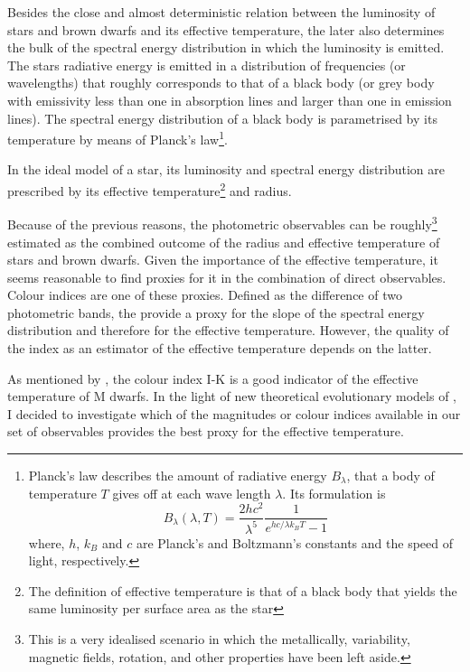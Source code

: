 Besides the close and almost deterministic relation between the luminosity of stars and brown dwarfs and its effective temperature, the later also determines the bulk of the spectral energy distribution in which the luminosity is emitted. The stars radiative energy is emitted in a distribution of frequencies (or wavelengths) that roughly corresponds to that of a black body (or grey body with emissivity less than one in absorption lines and larger than one in emission lines). The spectral energy distribution of a black body is parametrised by its temperature by means of Planck's law\footnote{
Planck's law describes the amount of radiative energy $B_{\lambda}$, that a body of temperature $T$ gives off at each wave length $\lambda$. Its formulation is 
\begin{equation}
B_\lambda (\lambda,T)=\frac{2hc^2}{\lambda^5}\frac{1}{e^{h c /\lambda k_B T}-1}\nonumber
\end{equation}
where, $h$, $k_B$ and $c$ are Planck's and Boltzmann's constants and the speed of light, respectively. 
}. 

In the ideal model of a star, its luminosity and spectral energy distribution are prescribed by its effective temperature\footnote{The definition of effective temperature is that of a black body that yields the same luminosity per surface area as the star} and radius. 

Because of the previous reasons, the photometric observables can be roughly\footnote{This is a very idealised scenario in which the metallically, variability, magnetic fields, rotation, and other properties have been left aside.} estimated as the combined outcome of the radius and effective temperature of stars and brown dwarfs. Given the importance of the effective temperature, it seems reasonable to find proxies for it in the combination of direct observables. Colour indices are one of these proxies. Defined as the difference of two photometric bands, the provide a proxy for the slope of the spectral energy distribution and therefore for the effective temperature.  However, the quality of the index as an estimator of the effective temperature depends on the latter. 

As mentioned by \citet{1998A&A...333..231B}, the colour index I-K is a good indicator of the effective temperature of M dwarfs. In the light of new theoretical evolutionary models of \citet{2014IAUS..299..271A}, I decided to investigate which of the magnitudes or colour indices available in our set of observables provides the best proxy for the effective temperature. 

